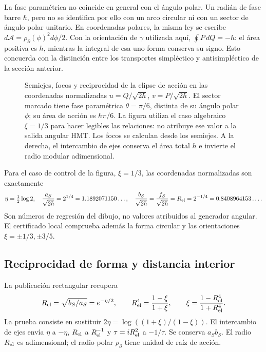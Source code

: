 La fase paramétrica no coincide en general con el ángulo polar. Un radián
de fase barre \(\hbar\), pero no se identifica por ello con un arco
circular ni con un sector de ángulo polar unitario. En coordenadas polares,
la misma ley se escribe
\(d\mathcal A=\rho_{\partial}(\phi)^2d\phi/2\).
Con la orientación de \(\gamma\) utilizada aquí,
\(\oint P\,dQ=-h\): el área positiva es \(h\), mientras la
integral de esa uno-forma conserva su signo. Esto concuerda con la
distinción entre los transportes simpléctico y antisimpléctico de la
sección anterior.

\begin{figure}[htbp]
 \centering
 
 \caption{Semiejes, focos y reciprocidad de la elipse de acción en las
 coordenadas normalizadas \(u=Q/\sqrt{2\hbar}\),
 \(v=P/\sqrt{2\hbar}\). El sector marcado tiene fase paramétrica
 \(\theta=\pi/6\), distinta de su ángulo polar \(\phi\); su área
 de acción es \(\hbar\pi/6\). La figura utiliza el caso algebraico
 \(\xi=1/3\) para hacer legibles las relaciones: no atribuye ese valor
 a la salida angular HMT. Los focos se calculan desde los semiejes.
 A la derecha, el intercambio de ejes conserva el área total \(h\)
 e invierte el radio modular adimensional.}
 \label{fig:ii-elipse-calculada}
\end{figure}

Para el caso de control de la figura, \(\xi=1/3\), las coordenadas
normalizadas son exactamente
\[
 \eta=\tfrac12\log2,\quad
 \frac{a_S}{\sqrt{2\hbar}}=2^{1/4}=1.1892071150\ldots,\quad
 \frac{b_S}{\sqrt{2\hbar}}=
 \frac{f_S}{\sqrt{2\hbar}}=R_{\rm el}=2^{-1/4}=0.8408964153\ldots.
\]
Son números de regresión del dibujo, no valores atribuidos al generador
angular. El certificado local comprueba además la forma circular y las
orientaciones \(\xi=\pm1/3,\pm3/5\).

\subsection{Reciprocidad de forma y distancia interior}

La publicación rectangular recupera
\begin{equation}
 R_{\rm el}=\sqrt{b_S/a_S}=e^{-\eta/2},\qquad
 R_{\rm el}^4=\frac{1-\xi}{1+\xi},\qquad
 \xi=\frac{1-R_{\rm el}^4}{1+R_{\rm el}^4}.
 \label{eq:ii-elipse-reciproca}
\end{equation}
La prueba consiste en sustituir
\(2\eta=\log((1+\xi)/(1-\xi))\). El intercambio de ejes
envía \(\eta\) a \(-\eta\), \(R_{\rm el}\) a
\(R_{\rm el}^{-1}\) y \(\tau=iR_{\rm el}^2\) a \(-1/\tau\).
Se conserva \(a_Sb_S\). El radio \(R_{\rm el}\) es adimensional;
el radio polar \(\rho_{\partial}\) tiene unidad de raíz de acción.

